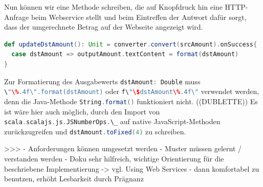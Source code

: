 \documentclass[a4paper, 12pt, hidelinks, listof=totoc, listoftables=totoc, bibliography=totoc]{scrreprt}
\newcommand{\scala}[1]{\lstinline[language=Scala, style=inline]|#1|}
\begin{document}
Nun können wir eine Methode schreiben, die auf Knopfdruck hin eine HTTP-Anfrage beim Webservice stellt und beim Eintreffen der Antwort dafür sorgt, dass der umgerechnete Betrag auf der Webseite angezeigt wird.

\begin{lstlisting}[language=Scala, style=snippet]
def updateDstAmount(): Unit = converter.convert(srcAmount).onSuccess{
  case dstAmount => outputAmount.textContent = format(dstAmount)
}
\end{lstlisting}

Zur Formatierung des Ausgabewerts \scala{dstAmount: Double} muss \scala{\"\%.4f\".format(dstAmount)} oder \scala{f\"\$dstAmount\%.4f\"} verwendet werden, denn die Java-Methode \scala{String.format()} funktioniert nicht. ((DUBLETTE)) Es ist wäre hier auch möglich, durch den Import von \scala{scala.scalajs.js.JSNumberOps.\_}
auf native JavaScript-Methoden zurückzugreifen und \scala{dstAmount.toFixed(4)} zu schreiben.

>>>
- Anforderungen können umgesetzt werden
- Muster müssen gelernt / verstanden werden
- Doku sehr hilfreich, wichtige Orientierung für die beschriebene Implementierung -> vgl. Using Web Services \cite[\#UsingWebServices]{haoyi.HOS}
- dann komfortabel zu benutzen, erhöht Lesbarkeit durch Prägnanz




%
\end{document}

